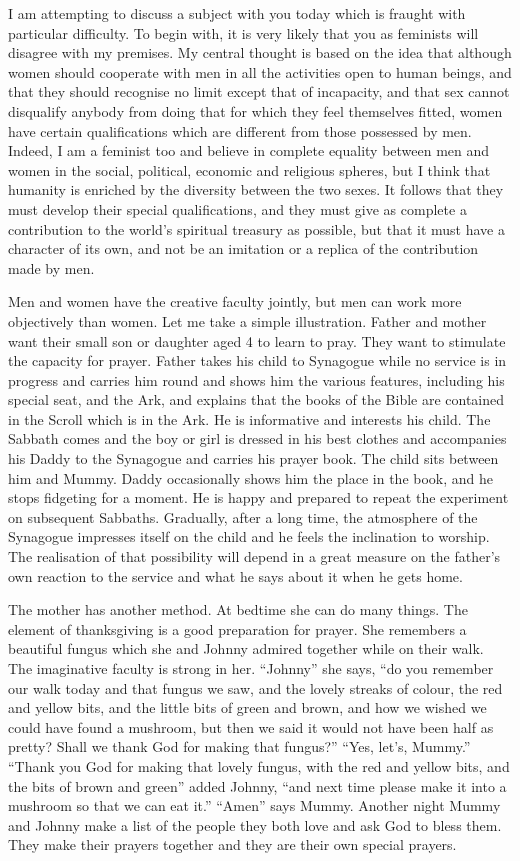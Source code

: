 \documentclass[14pt, article, extrafontsizes, twopage, a4paper]{memoir}
\begin{document}
I am attempting to discuss a subject with you today
which is fraught with particular difficulty. To begin
with, it is very likely that you as feminists will disagree
with my premises. My central thought is based on the idea
that although women should cooperate with men in all the
activities open to human beings, and that they should
recognise no limit except that of incapacity, and that sex
cannot disqualify anybody from doing that for which they
feel themselves fitted, women have certain qualifications
which are different from those possessed by men. Indeed, I
am a feminist too and believe in complete equality between
men and women in the social, political, economic and religious
spheres, but I think that humanity is enriched by the
diversity between the two sexes. It follows that they must
develop their special qualifications, and they must give as
complete a contribution to the world's spiritual treasury
as possible, but that it must have a character of its own,
and not be an imitation or a replica of the contribution
made by men.

Men and women have the creative faculty jointly, but
men can work more objectively than women. Let me take a
simple illustration. Father and mother want their small
son or daughter aged 4 to learn to pray. They want to
stimulate the capacity for prayer. Father takes his child
to Synagogue while no service is in progress and carries
him round and shows him the various features, including his
special seat, and the Ark, and explains that the books of
the Bible are contained in the Scroll which is in the Ark.
He is informative and interests his child. The Sabbath
comes and the boy or girl is dressed in his best clothes
and accompanies his Daddy to the Synagogue and carries his
prayer book. The child sits between him and Mummy. Daddy
occasionally shows him the place in the book, and he stops
fidgeting for a moment. He is happy and prepared to repeat
the experiment on subsequent Sabbaths. Gradually, after a
long time, the atmosphere of the Synagogue impresses itself
on the child and he feels the inclination to worship. The
realisation of that possibility will depend in a great
measure on the father's own reaction to the service and
what he says about it when he gets home.

The mother has another method. At bedtime she can do
many things. The element of thanksgiving is a good
preparation for prayer. She remembers a beautiful fungus
which she and Johnny admired together while on their walk.
The imaginative faculty is strong in her. ``Johnny'' she
says, ``do you remember our walk today and that fungus we
saw, and the lovely streaks of colour, the red and yellow
bits, and the little bits of green and brown, and how we
wished we could have found a mushroom, but then we said it
would not have been half as pretty? Shall we thank God
for making that fungus?'' ``Yes, let's, Mummy.'' ``Thank you
God for making that lovely fungus, with the red and yellow
bits, and the bits of brown and green'' added Johnny, ``and
next time please make it into a mushroom so that we can eat
it.'' ``Amen'' says Mummy. Another night Mummy and Johnny
make a list of the people they both love and ask God to
bless them. They make their prayers together and they are
their own special prayers.
\end{document}
